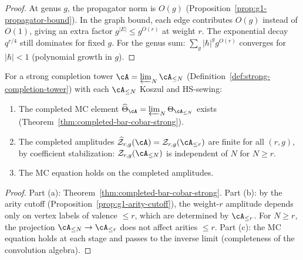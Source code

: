 \begin{proof}
At genus $g$, the propagator norm is $O(g)$
(Proposition~\ref{prop:g1-propagator-bound}).  In the graph
bound, each edge contributes $O(g)$ instead of $O(1)$, giving
an extra factor $g^{|E|} \leq g^{O(r)}$ at weight $r$.
The exponential decay $q^{r/4}$ still dominates for fixed $g$.
For the genus sum: $\sum_g |\hbar|^g g^{O(r)}$ converges for
$|\hbar| < 1$ (polynomial growth in $g$).
\end{proof}

\begin{theorem}%
\label{thm:g1-completed-finiteness}%
%
For a strong completion tower
$\cA = \varprojlim_N \cA_{\leq N}$
\textup{(}Definition~\textup{\ref{def:strong-completion-tower})}
with each $\cA_{\leq N}$ Koszul and HS-sewing:
\begin{enumerate}[label=\textup{(\alph*)}]
\item The completed MC element
  $\widehat{\Theta}_\cA = \varprojlim_N
  \Theta_{\cA_{\leq N}}$ exists
  \textup{(}Theorem~\textup{\ref{thm:completed-bar-cobar-strong})}.
\item The completed amplitudes
  $\widehat{\mathcal{Z}}_{r,g}(\cA) =
  \mathcal{Z}_{r,g}(\cA_{\leq r})$
  are finite for all $(r,g)$, by coefficient stabilization:
  $\mathcal{Z}_{r,g}(\cA_{\leq N})$ is independent of $N$
  for $N \geq r$.
\item The MC equation holds on the completed amplitudes.
\end{enumerate}
\end{theorem}

\begin{proof}
Part (a): Theorem~\ref{thm:completed-bar-cobar-strong}.
Part (b): by the arity cutoff
(Proposition~\ref{prop:g1-arity-cutoff}), the weight-$r$
amplitude depends only on vertex labels of valence $\leq r$,
which are determined by $\cA_{\leq r}$.  For $N \geq r$, the
projection $\cA_{\leq N} \to \cA_{\leq r}$ does not affect
arities $\leq r$.  Part (c): the MC equation holds at each
stage and passes to the inverse limit (completeness of the
convolution algebra).
\end{proof}

%
%

